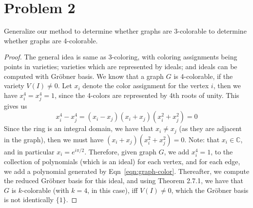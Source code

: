\documentclass{article}[12pt]
\def\CC{\mathbb C}
\begin{document}
\section*{Problem 2} Generalize our method to determine whether graphs are
3-colorable to determine whether graphs are 4-colorable.
\begin{proof}
The general idea is same as 3-coloring, with coloring assignments
being points in varieties; varieties which are represented by ideals;
and ideals can be computed with Gr\"obner basis.
We know that a graph $G$ is 4-colorable, if the variety $V(I)\ne 0$.
Let $x_i$ denote the color assignment for the vertex $i$, then we have
$x_i^4=x_j^4=1$, since the 4-colors are represented by 4th roots of unity.
This gives us
\begin{equation}
x_i^4-x_j^4 = (x_i-x_j)(x_i+x_j)(x_i^2+x_j^2) = 0 \label{eqn:graph-color}
\end{equation}
Since the ring is an integral domain, we have that $x_i\ne x_j$ (as they
are adjacent in the graph), then we must have $(x_i+x_j)(x_i^2+x_j^2)=0$.
Note: that $x_i \in \CC$, and in particular $x_i = e^{i\pi/2}$.
Therefore, given graph $G$, we add $x_i^4=1$, to the collection of
polynomials (which is an ideal)
for each vertex, and for each edge, we add a polynomial
generated by Eqn~\ref{eqn:graph-color}. Thereafter, we compute the
reduced Gr\"obner basis for this ideal, and using Theorem 2.7.1, we have
that $G$ is $k$-colorable (with $k=4$, in this case), iff $V(I)\ne 0$, which
the Gr\"obner basis is not identically $\{1\}$.
\end{proof}
\end{document}
